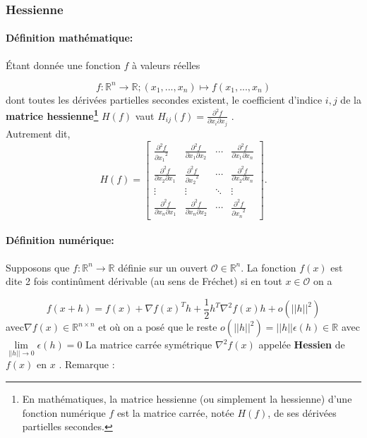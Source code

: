 \subsubsection{\textbf{Hessienne}}
\paragraph*{Définition mathématique:}
Étant donnée une fonction ${f}$ à valeurs réelles

$${ f:\mathbb{R}^{n}\to \mathbb {R} ;(x_{1},...,x_{n})\mapsto f(x_{1},...,x_{n})}$$
dont toutes les dérivées partielles secondes existent, le coefficient d'indice ${ i,j}$ de la \textbf{matrice hessienne\footnote{En mathématiques, la matrice hessienne (ou simplement la hessienne) d'une fonction numérique $f$ est la matrice carrée, notée $H(f)$, de ses dérivées partielles secondes.}} ${H(f)}$ vaut ${H_{ij}(f)={\frac {\partial ^{2}f}{\partial x_{i}\partial x_{j}}}}$ \cite{jtshiman:2021}.\\
Autrement dit,
$$
{ H(f)={
		\begin{bmatrix}{
			\frac {\partial ^{2}f}{{\partial x_{1}}^{2}}}&{\frac {\partial ^{2}f}{\partial x_{1}\partial x_{2}}}&\cdots &{\frac {\partial ^{2}f}{\partial x_{1}\partial x_{n}}}\\
		{\frac {\partial ^{2}f}{\partial x_{2}\partial x_{1}}}&{\frac {\partial ^{2}f}{{\partial x_{2}}^{2}}}&\cdots &{\frac {\partial ^{2}f}{\partial x_{2}\partial x_{n}}}\\
		\vdots &\vdots &\ddots &\vdots \\
		{\frac {\partial ^{2}f}{\partial x_{n}\partial x_{1}}}&{\frac {\partial ^{2}f}{\partial x_{n}\partial x_{2}}}&\cdots &{\frac {\partial ^{2}f}{{\partial x_{n}}^{2}}}
		\end{bmatrix}}} .
$$

\paragraph*{Définition numérique:}
Supposons que $f : \mathbb{R}^{n} \to \mathbb{R}$ définie sur un ouvert $\mathcal{O} \in \mathbb{R}^{n}$. La fonction $f(x)$ est dite 2
fois continûment dérivable (au sens de Fréchet) si en tout $x \in \mathcal{O}$ on a

\begin{equation}
f(x + h) = f(x)+\nabla f(x)^Th + \frac{1}{2}h^T\nabla^2f(x)h+o(||h||^2)
\end{equation}
avec$\nabla f(x)\in \mathbb{R}^{n\times n}$ et où on a posé que le reste 
$ o(||h||^2) =||h|| \epsilon(h) \in \mathbb{R} $ avec 
$\lim\limits_{||h|| \to 0} \epsilon(h) = 0 $
La matrice carrée symétrique $\nabla^2 f(x)$ appelée \textbf{Hessien} de $f(x)$ en $x$ \cite{bierlaire2006introduction}. Remarque :

